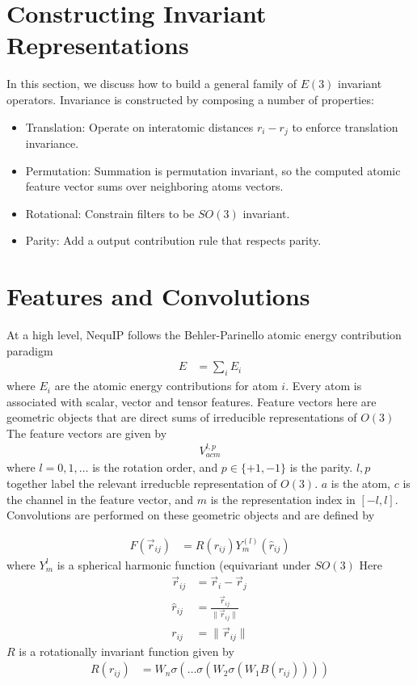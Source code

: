 \documentclass[book.tex]{subfiles}
\begin{document}
\section{Constructing Invariant Representations}
In this section, we discuss how to build a general family of $E(3)$ invariant operators. Invariance is constructed by composing a number of properties:

\begin{itemize}
    \item Translation: Operate on interatomic distances $r_i - r_j$ to enforce translation invariance.
    \item Permutation: Summation is permutation invariant, so the computed atomic feature vector sums over neighboring atoms vectors.
    \item Rotational: Constrain filters to be $SO(3)$ invariant.
    \item Parity: Add a output contribution rule that respects parity.
\end{itemize}

\section{Features and Convolutions}

At a high level, NequIP follows the Behler-Parinello atomic energy contribution paradigm
\begin{align}
    E &= \sum_{i} E_i
\end{align}
where $E_i$ are the atomic energy contributions for atom $i$. Every atom is associated with scalar, vector and tensor features. Feature vectors here are geometric objects that are direct sums of irreducible representations of $O(3)$ %
The feature vectors are given by
\begin{align}
    V^{l,p}_{acm}
\end{align}
where $l = 0, 1, \dotsc$ is the rotation order, and $p \in \{+1,-1\}$ is the parity. $l, p$ together label the relevant irreducble representation of $O(3)$. $a$ is the atom, $c$ is the channel in the feature vector, and $m$ is the representation index in $[-l, l]$. Convolutions are performed on these geometric objects and are defined by

\begin{align}
F(\vec{r}_{ij}) &= R(r_{ij})Y^{(l)}_m(\hat{r}_{ij})
\end{align}
where $Y^l_m$ is a spherical harmonic function (equivariant under $SO(3)$ %
Here 
\begin{align}
\vec{r}_{ij} &= \vec{r}_i - \vec{r}_j \\
\hat{r}_{ij} &= \frac{\vec{r}_{ij}}{\|\vec{r}_{ij}\|} \\
r_{ij} &= \|\vec{r}_{ij}\|
\end{align}
$R$ is a rotationally invariant function given by
\begin{align}
    R(r_{ij}) &= W_n\sigma(\dotsc \sigma(W_2\sigma(W_1 B(r_{ij}))))
\end{align}
\end{document}
